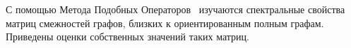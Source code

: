 С помощью Метода Подобных Операторов~\cite{baskakov-harmonic,baskakov1983}
изучаются спектральные свойства
матриц смежностей графов, близких к ориентированным полным графам.
Приведены оценки собственных значений таких матриц.
